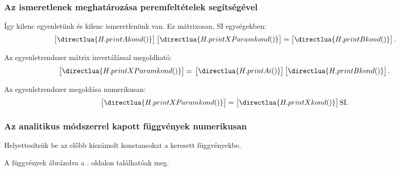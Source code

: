 \subsubsection{Az ismeretlenek meghatározása peremfeltételek segítségével}



Így kilenc egyenletünk és kilenc ismeretlenünk van. Ez mátrixosan,
SI egységekben:
\scriptsize
\begin{equation}
  \bgroup
  \sifigures{2}
  \sisci{}
  \begin{bmatrix}
    \directlua{H.printAkond()}
  \end{bmatrix}
  \egroup
  \begin{bmatrix}
    \directlua{H.printXParamkond()}
  \end{bmatrix}
  =
  \siplaces{3}
  \begin{bmatrix}
    \directlua{H.printBkond()}
  \end{bmatrix}
  \text.
  \label{eq:alma}
\end{equation}
\normalsize

Az egyenletrendszer mátrix invertálással megoldható:
\scriptsize
\begin{equation}
  \begin{bmatrix}
    \directlua{H.printXParamkond()}
  \end{bmatrix}
  =
  \bgroup
  \sifigures{2}
  \sisci{}
  \begin{bmatrix}
    \directlua{H.printAi()}
  \end{bmatrix}
  \egroup
  \siplaces{3}
  \begin{bmatrix}
    \directlua{H.printBkond()}
  \end{bmatrix}
  \label{eq:alma-inverted}
  \text.
\end{equation}
\normalsize

Az egyenletrendszer megoldása numerikusan:
\begin{equation}
  \begin{bmatrix}
    \directlua{H.printXParamkond()}
  \end{bmatrix}
  =
  \sifigures{6}
  \begin{bmatrix}
    \directlua{H.printXkond()}
  \end{bmatrix}
  \mathrm{SI}
  \text.
  \label{eq:alma-sol}
\end{equation}

\subsubsection{Az analitikus módszerrel kapott függvények numerikusan}

Helyettesítsük be az előbb kiszámolt konstansokat a keresett függvényekbe.




% 

A függvények ábrázolva a \pageref{fig:plot-v}. oldalon találhatóak meg.
